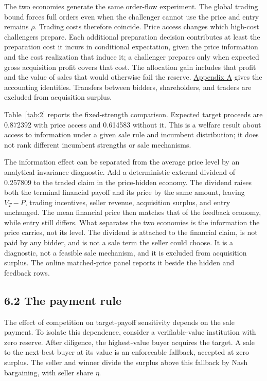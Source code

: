 \documentclass[
  12pt,
]{article}
\begin{document}
The two economies generate the same order-flow experiment. The global
trading bound forces full orders even when the challenger cannot use the
price and entry remains \(\rho\). Trading costs therefore coincide.
Price access changes which high-cost challengers prepare. Each
additional preparation decision contributes at least the preparation
cost it incurs in conditional expectation, given the price information
and the cost realization that induce it; a challenger prepares only when
expected gross acquisition profit covers that cost. The allocation gain
includes that profit and the value of sales that would otherwise fail
the reserve. \hyperref[paper-appendix]{Appendix A} gives the accounting
identities. Transfers between bidders, shareholders, and traders are
excluded from acquisition surplus.

Table~\ref{tab:2} reports the fixed-strength comparison. Expected target
proceeds are 0.872392 with price access and 0.614583 without it. This is
a welfare result about access to information under a given sale rule and
incumbent distribution; it does not rank different incumbent strengths
or sale mechanisms.

The information effect can be separated from the average price level by
an analytical invariance diagnostic. Add a deterministic external
dividend of 0.257809 to the traded claim in the price-hidden economy.
The dividend raises both the terminal financial payoff and its price by
the same amount, leaving \(V_T-P\), trading incentives, seller revenue,
acquisition surplus, and entry unchanged. The mean financial price then
matches that of the feedback economy, while entry still differs. What
separates the two economies is the information the price carries, not
its level. The dividend is attached to the financial claim, is not paid
by any bidder, and is not a sale term the seller could choose. It is a
diagnostic, not a feasible sale mechanism, and it is excluded from
acquisition surplus. The online matched-price panel reports it beside
the hidden and feedback rows.

\subsection{6.2 The payment rule}\label{sec-the-payment-rule}

The effect of competition on target-payoff sensitivity depends on the
sale payment. To isolate this dependence, consider a verifiable-value
institution with zero reserve. After diligence, the highest-value buyer
acquires the target. A sale to the next-best buyer at its value is an
enforceable fallback, accepted at zero surplus. The seller and winner
divide the surplus above this fallback by Nash bargaining, with seller
share \(\eta\).
\end{document}
